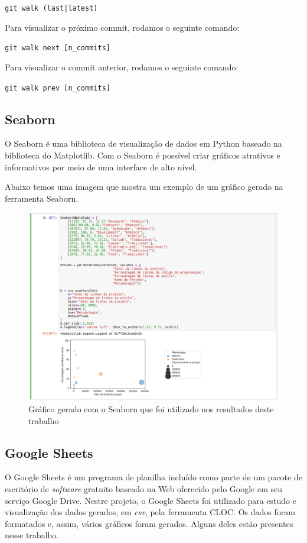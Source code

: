\texttt{git walk (last|latest)}

Para visualizar o próximo commit, rodamos o seguinte comando:

\texttt{git walk next [n\_commits]}

Para visualizar o commit anterior, rodamos o seguinte comando:

\texttt{git walk prev [n\_commits]}

\hypertarget{seaborn}{%
\subsection{Seaborn}\label{seaborn}}

O Seaborn é uma biblioteca de visualização de dados em Python baseado na biblioteca do Matplotlib. Com o Seaborn é possível criar gráficos atrativos e informativos por meio de uma interface de alto nível.

Abaixo temos uma imagem que mostra um exemplo de um gráfico gerado na ferramenta Seaborn.

\begin{figure}[H]
\centering
\includegraphics{figuras/seaborn.png}
\caption{Gráfico gerado com o Seaborn que foi utilizado nos resultados deste trabalho}
\end{figure}

\hypertarget{googlesheets}{%
\subsection{Google Sheets}\label{googlesheets}}

O Google Sheets é um programa de planilha incluído como parte de um pacote de escritório de \emph{software} gratuito baseado na Web oferecido pelo Google em seu serviço Google Drive. Nestre projeto, o Google Sheets foi utilizado para estudo e visualização dos dados gerados, em \emph{csv}, pela ferramenta CLOC. Os dados foram formatados e, assim, vários gráficos foram gerados. Alguns deles estão presentes nesse trabalho.

